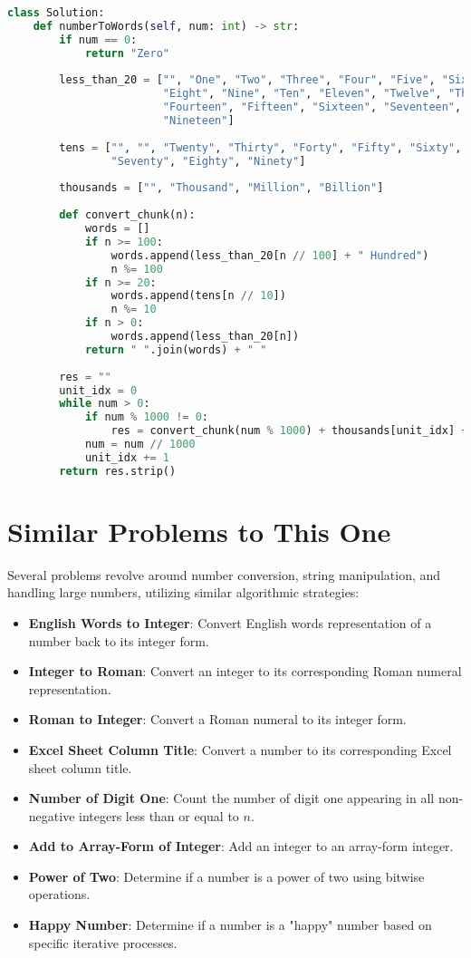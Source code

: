 \begin{lstlisting}[language=Python]
class Solution:
    def numberToWords(self, num: int) -> str:
        if num == 0:
            return "Zero"
        
        less_than_20 = ["", "One", "Two", "Three", "Four", "Five", "Six", "Seven",
                        "Eight", "Nine", "Ten", "Eleven", "Twelve", "Thirteen",
                        "Fourteen", "Fifteen", "Sixteen", "Seventeen", "Eighteen",
                        "Nineteen"]
        
        tens = ["", "", "Twenty", "Thirty", "Forty", "Fifty", "Sixty",
                "Seventy", "Eighty", "Ninety"]
        
        thousands = ["", "Thousand", "Million", "Billion"]
        
        def convert_chunk(n):
            words = []
            if n >= 100:
                words.append(less_than_20[n // 100] + " Hundred")
                n %= 100
            if n >= 20:
                words.append(tens[n // 10])
                n %= 10
            if n > 0:
                words.append(less_than_20[n])
            return " ".join(words) + " "
        
        res = ""
        unit_idx = 0
        while num > 0:
            if num % 1000 != 0:
                res = convert_chunk(num % 1000) + thousands[unit_idx] + " " + res
            num = num // 1000
            unit_idx += 1
        return res.strip()
\end{lstlisting}

\section*{Similar Problems to This One}

Several problems revolve around number conversion, string manipulation, and handling large numbers, utilizing similar algorithmic strategies:

\begin{itemize}
    \item \textbf{English Words to Integer}: Convert English words representation of a number back to its integer form.
    \item \textbf{Integer to Roman}: Convert an integer to its corresponding Roman numeral representation.
    \item \textbf{Roman to Integer}: Convert a Roman numeral to its integer form.
    \item \textbf{Excel Sheet Column Title}: Convert a number to its corresponding Excel sheet column title.
    \item \textbf{Number of Digit One}: Count the number of digit one appearing in all non-negative integers less than or equal to \(n\).
    \item \textbf{Add to Array-Form of Integer}: Add an integer to an array-form integer.
    \item \textbf{Power of Two}: Determine if a number is a power of two using bitwise operations.
    \item \textbf{Happy Number}: Determine if a number is a "happy" number based on specific iterative processes.
\end{itemize}


